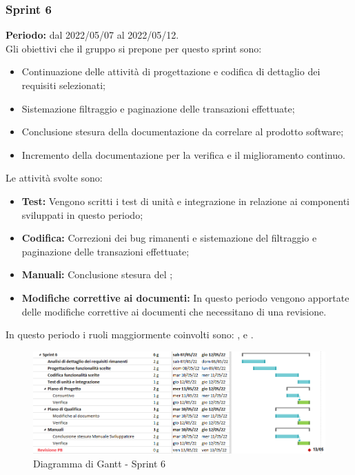 \subsubsection{Sprint 6} \label{subsubsection:sprint_6}
\textbf{Periodo:} dal 2022/05/07 al 2022/05/12.
\bigskip
\\Gli obiettivi che il gruppo si prepone per questo sprint\glo{} sono:
\begin{itemize}
  \item Continuazione delle attività di progettazione e codifica di dettaglio dei requisiti selezionati;
  \item Sistemazione filtraggio e paginazione delle transazioni effettuate;
  \item Conclusione stesura della documentazione da correlare al prodotto software;
  \item Incremento della documentazione per la verifica e il miglioramento continuo.
\end{itemize}
Le attività svolte sono:
\begin{itemize}
  \item \textbf{Test:} Vengono scritti i test di unità e integrazione in relazione ai componenti sviluppati in questo periodo;
  \item \textbf{Codifica:} Correzioni dei bug\glo{} rimanenti e sistemazione del filtraggio e paginazione delle transazioni effettuate;
  \item \textbf{Manuali:} Conclusione stesura del \docNameVersionMS{};
  \item \textbf{Modifiche correttive ai documenti:} In questo periodo vengono apportate delle modifiche correttive ai documenti che necessitano di una revisione.
\end{itemize}
In questo periodo i ruoli maggiormente coinvolti sono: \roleDesignerLow{}, \roleProgrammerLow{} e \roleVerifierLow{}.
\begin{figure}[H]
  \centering
  \includegraphics[scale=0.55]{immagini/6sprint.png}
  \caption{Diagramma di Gantt - Sprint 6}
\end{figure}
\pagebreak

